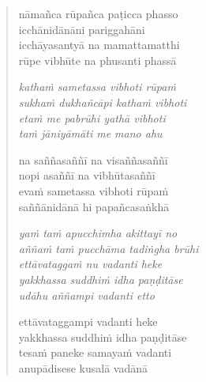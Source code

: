 \clearpage
\begin{verse}

nāmañca rūpañca paṭicca phasso\\
icchānidānāni pariggahāni\\
icchāyasantyā na mamattamatthi\\
rūpe vibhūte na phusanti phassā

\emph{kathaṁ sametassa vibhoti rūpaṁ\\
sukhaṁ dukhañcāpi kathaṁ vibhoti}\\
\emph{etaṁ me pabrūhi yathā vibhoti\\
taṁ jāniyāmāti me mano ahu}

na saññasaññī na visaññasaññī\\
nopi asaññī na vibhūtasaññī\\
evaṁ sametassa vibhoti rūpaṁ\\
saññānidānā hi papañcasaṅkhā

\emph{yaṁ taṁ apucchimha akittayī no}\\
\emph{aññaṁ taṁ pucchāma tadiṅgha brūhi}\\
\emph{ettāvataggaṁ nu vadanti heke}\\
\emph{yakkhassa suddhiṁ idha paṇḍitāse}\\
\emph{udāhu aññampi vadanti etto}

ettāvataggampi vadanti heke\\
yakkhassa suddhiṁ idha paṇḍitāse\\
tesaṁ paneke samayaṁ vadanti\\
anupādisese kusalā vadānā

\end{verse}


